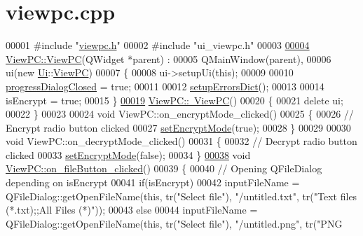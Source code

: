\hypertarget{viewpc_8cpp_source}{}\section{viewpc.\+cpp}

\begin{DoxyCode}
00001 \textcolor{preprocessor}{#include "\hyperlink{viewpc_8h}{viewpc.h}"}
00002 \textcolor{preprocessor}{#include "ui\_viewpc.h"}
00003 
\hypertarget{viewpc_8cpp_source.tex_l00004}{}\hyperlink{class_view_p_c_a33c96c61f61042319c66c19059836b7f}{00004} \hyperlink{class_view_p_c_a33c96c61f61042319c66c19059836b7f}{ViewPC::ViewPC}(QWidget *parent) :
00005     QMainWindow(parent),
00006     ui(new \hyperlink{namespace_ui}{Ui}::\hyperlink{class_view_p_c}{ViewPC})
00007 \{
00008     ui->setupUi(\textcolor{keyword}{this});
00009 
00010     \hyperlink{class_view_p_c_add8c82aa2b0b934212aa5bde9277ab36}{progressDialogClosed} = \textcolor{keyword}{true};
00011 
00012     \hyperlink{class_view_p_c_a89236a0bb8760f02e984b85a8571934c}{setupErrorsDict}();
00013 
00014     isEncrypt = \textcolor{keyword}{true};
00015 \}
\hypertarget{viewpc_8cpp_source.tex_l00019}{}\hyperlink{class_view_p_c_a91c51f5c1e6ed5ab12b410339f469b0f}{00019} \hyperlink{class_view_p_c_a91c51f5c1e6ed5ab12b410339f469b0f}{ViewPC::~ViewPC}()
00020 \{
00021     \textcolor{keyword}{delete} ui;
00022 \}
00023 
00024 \textcolor{keywordtype}{void} ViewPC::on\_encryptMode\_clicked()
00025 \{
00026     \textcolor{comment}{// Encrypt radio button clicked}
00027     \hyperlink{class_view_p_c_a5b48951efefdc0e3039c9a4bf185320b}{setEncryptMode}(\textcolor{keyword}{true});
00028 \}
00029 
00030 \textcolor{keywordtype}{void} ViewPC::on\_decryptMode\_clicked()
00031 \{
00032     \textcolor{comment}{// Decrypt radio button clicked}
00033     \hyperlink{class_view_p_c_a5b48951efefdc0e3039c9a4bf185320b}{setEncryptMode}(\textcolor{keyword}{false});
00034 \}
\hypertarget{viewpc_8cpp_source.tex_l00038}{}\hyperlink{class_view_p_c_a3b9b7a7be9702d8b160f257f1c74a776}{00038} \textcolor{keywordtype}{void} \hyperlink{class_view_p_c_a3b9b7a7be9702d8b160f257f1c74a776}{ViewPC::on\_fileButton\_clicked}()
00039 \{
00040     \textcolor{comment}{// Opening QFileDialog depending on isEncrypt}
00041     \textcolor{keywordflow}{if}(isEncrypt)
00042         inputFileName = QFileDialog::getOpenFileName(\textcolor{keyword}{this}, tr(\textcolor{stringliteral}{"Select file"}), \textcolor{stringliteral}{"/untitled.txt"}, tr(\textcolor{stringliteral}{"Text
       files (*.txt);;All Files (*)"}));
00043     \textcolor{keywordflow}{else}
00044         inputFileName = QFileDialog::getOpenFileName(\textcolor{keyword}{this}, tr(\textcolor{stringliteral}{"Select file"}), \textcolor{stringliteral}{"/untitled.png"}, tr(\textcolor{stringliteral}{"PNG
}
\end{DoxyCode}
